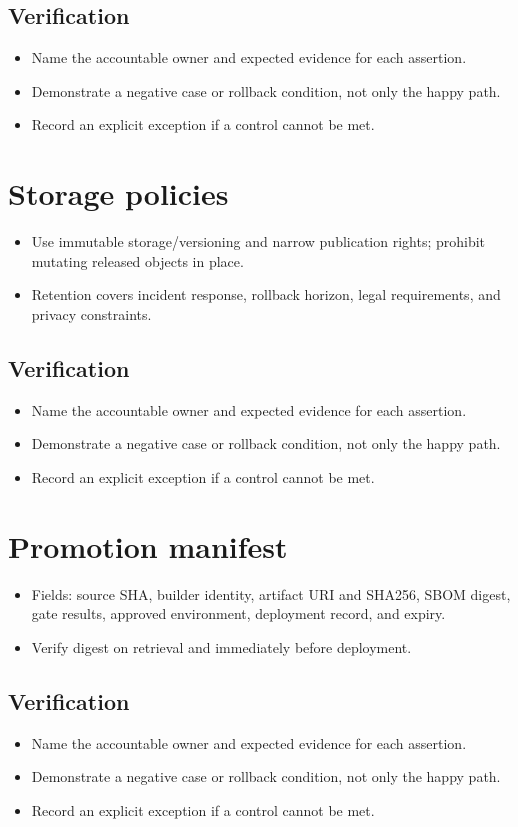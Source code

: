 \documentclass[10pt,letterpaper]{article}
\begin{document}
\subsection{Verification}
\begin{itemize}
\item Name the accountable owner and expected evidence for each assertion.
\item Demonstrate a negative case or rollback condition, not only the happy path.
\item Record an explicit exception if a control cannot be met.
\end{itemize}


\section{Storage policies}
\begin{itemize}
\item Use immutable storage/versioning and narrow publication rights; prohibit mutating released objects in place.
\item Retention covers incident response, rollback horizon, legal requirements, and privacy constraints.
\end{itemize}
\subsection{Verification}
\begin{itemize}
\item Name the accountable owner and expected evidence for each assertion.
\item Demonstrate a negative case or rollback condition, not only the happy path.
\item Record an explicit exception if a control cannot be met.
\end{itemize}


\section{Promotion manifest}
\begin{itemize}
\item Fields: source SHA, builder identity, artifact URI and SHA256, SBOM digest, gate results, approved environment, deployment record, and expiry.
\item Verify digest on retrieval and immediately before deployment.
\end{itemize}
\subsection{Verification}
\begin{itemize}
\item Name the accountable owner and expected evidence for each assertion.
\item Demonstrate a negative case or rollback condition, not only the happy path.
\item Record an explicit exception if a control cannot be met.
\end{itemize}
\end{document}
